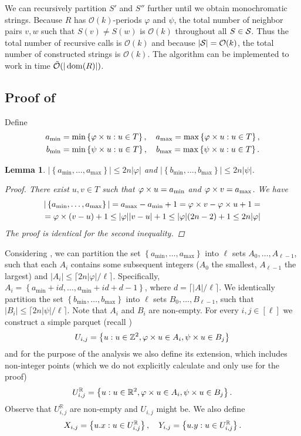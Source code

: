 \documentclass[11pt]{article}
\newcommand{\R}{\mathbb{R}}
\newcommand{\Z}{\mathbb{Z}}
\renewcommand{\O}{\mathcal{O}}
\newcommand{\tO}{\tilde{\mathcal{O}}}
\renewcommand{\phi}{\varphi}
\newcommand{\set}[1]{\left\lbrace #1 \right\rbrace}
\newcommand{\eq}[1]{\begin{align*} #1 \end{align*}}
\theoremstyle{plain}
\newtheorem{lemma}{Lemma}
\theoremstyle{definition}
\theoremstyle{remark}
\begin{document}
We can recursively partition $S'$ and $S''$ further until we obtain monochromatic strings.
Because $R$ has $\O(k)$-periods $\phi$ and $\psi$, the total number of neighbor pairs $v, w$ such that $S(v) \neq S(w)$ is $\O(k)$ throughout all $S \in \S$.
Thus the total number of recursive calls is $\O(k)$ and because $|\S| = \O(k)$, the total number of constructed strings is $\O(k)$.
The algorithm can be implemented to work in time $\tO(|\d{R}|)$.


\subsection{Proof of } \label{text_decomposition_proof}
Define
\eq{
	a_{\min} &= \min \set{\h{u} : u \in T}, \quad a_{\max} = \max \set{\h{u} : u \in T},\\
	b_{\min} &= \min \set{\s{u} : u \in T}, \quad b_{\max} = \max \set{\s{u} : u \in T}.
}

\begin{lemma}\label{AB_size_bound}
	$|\set{a_{\min}, \dots, a_{\max}}| \le 2n|\phi|$ and $|\set{b_{\min}, \dots, b_{\max}}| \le 2n|\psi|$.
	\begin{proof}
		There exist $u, v \in T$ such that $\h{u} = a_{\min}$ and $\h{v} = a_{\max}$. We have
		\eq{
			|\set{a_{\min}, \dots, a_{\max}}| = 
			a_{\max} - a_{\min} + 1 = \h{v} - \h{u} + 1 = \\
			= \h{(v - u)} + 1 \le |\phi||v - u| + 1 \le |\phi|(2n - 2) + 1 \le 2n|\phi|
		}
		The proof is identical for the second inequality.
	\end{proof}
\end{lemma}

Considering , we can partition the set $\set{a_{\min}, \dots, a_{\max}}$ into $\ell$ sets $A_0, \dots, A_{\ell - 1}$, such that each $A_i$ contains some subsequent integers ($A_0$ the smallest, $A_{\ell - 1}$ the largest) and $|A_i| \le \lceil 2n|\phi| / \ell \rceil$.
Specifically, 
$ A_i = \set{a_{\min} + id, \dots, a_{\min} + id + d - 1} $, where $d = \lceil |A| / \ell \rceil$.
We identically partition the set $\set{b_{\min}, \dots, b_{\max}}$ into $\ell$ sets $B_0, \dots, B_{\ell - 1}$, such that $|B_i| \le \lceil 2n|\psi| / \ell \rceil$.
Note that $A_i$ and $B_i$ are non-empty.
For every $i, j \in [\ell]$ we construct a simple parquet (recall )
$$ U_{i,j} = \set{u : u \in \Z^2, \h{u} \in A_i, \s{u} \in B_j}$$
and for the purpose of the analysis we also define its extension, which includes non-integer points (which we do not explicitly calculate and only use for the proof)
$$ U^\R_{i,j} = \set{u : u \in \R^2, \h{u} \in A_i, \s{u} \in B_j}.$$
Observe that $U^\R_{i, j}$ are non-empty and $U_{i, j}$ might be.
We also define
$$ X_{i, j} = \set{\x{u} : u \in U^\R_{i, j}}, \quad Y_{i, j} = \set{\y{u} : u \in U^\R_{i, j}}.$$
\end{document}
